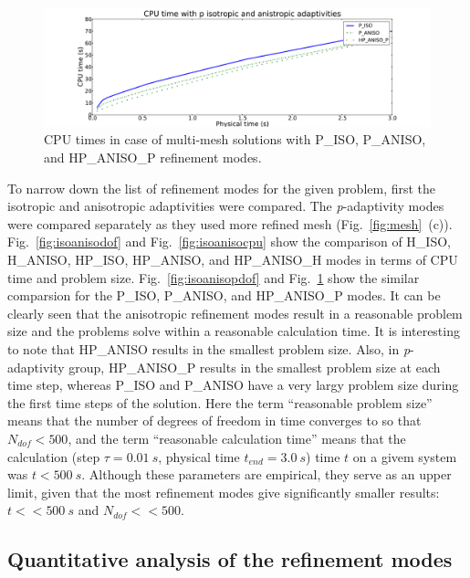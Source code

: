 \begin{figure}[!ht]
  \begin{centering}
  \includegraphics[width=\columnwidth]{isoanisop_cpu}
  \caption{\label{fig:isoanisopcpu} CPU times in case 
  of multi-mesh solutions with P\_ISO, P\_ANISO, and
  HP\_ANISO\_P refinement modes.}
  \end{centering}
\end{figure}
To narrow down the list of refinement modes for the given problem, first the
isotropic and anisotropic adaptivities were compared. The \emph{p}-adaptivity
modes were compared separately as they used more refined mesh (Fig.~\ref{fig:mesh}~(c)).
Fig.~\ref{fig:isoanisodof} and Fig.~\ref{fig:isoanisocpu} show the comparison
of H\_ISO, H\_ANISO, HP\_ISO, HP\_ANISO, and HP\_ANISO\_H modes in terms of CPU time
and problem size.
Fig.~\ref{fig:isoanisopdof} and Fig.~\ref{fig:isoanisopcpu} show the similar
comparsion for the P\_ISO, P\_ANISO, and HP\_ANISO\_P modes.
It can be clearly seen that the anisotropic refinement modes result in a reasonable problem
size and the problems solve within a reasonable calculation time. It is interesting
to note that HP\_ANISO results in the smallest problem size. Also, in
\emph{p}-adaptivity group, HP\_ANISO\_P results in the smallest problem size
at each time step, whereas P\_ISO and P\_ANISO have a very largy problem size
during the first time steps of the solution.
Here the term ``reasonable problem size''
means that the number of degrees of freedom in time converges
to so that $N_{dof}<500$, and the term ``reasonable calculation time''
means that the calculation (step $\tau=0.01\ s$, physical
time $t_{end}=3.0\ s$) time $t$ on a givem system was $t<500\ s$.
Although these parameters are empirical, they serve as an upper limit, given
that the most refinement modes give significantly smaller results:
$t<<500\ s$ and $N_{dof} << 500$.

\subsection{Quantitative analysis of the refinement modes}

